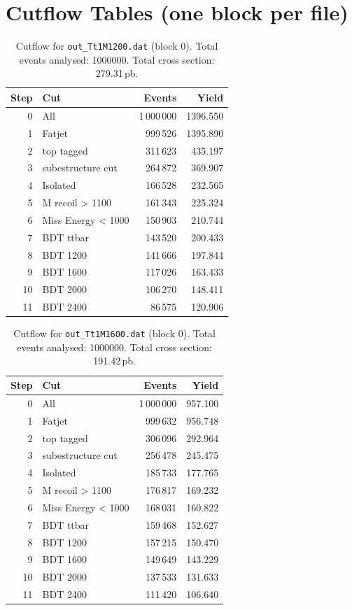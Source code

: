 \documentclass{article}
\begin{document}
\section*{Cutflow Tables (one block per file)}
\begin{table}[H]
\centering
\begin{tabular}{r l r r}
\toprule
Step & Cut & Events & Yield \\
\midrule
0 & All & 1\,000\,000 & 1396.550 \\
1 & Fatjet & 999\,526 & 1395.890 \\
2 & top tagged & 311\,623 & 435.197 \\
3 & subestructure cut & 264\,872 & 369.907 \\
4 & Isolated & 166\,528 & 232.565 \\
5 & M recoil > 1100 & 161\,343 & 225.324 \\
6 & Miss Energy < 1000 & 150\,903 & 210.744 \\
7 & BDT ttbar & 143\,520 & 200.433 \\
8 & BDT 1200 & 141\,666 & 197.844 \\
9 & BDT 1600 & 117\,026 & 163.433 \\
10 & BDT 2000 & 106\,270 & 148.411 \\
11 & BDT 2400 & 86\,575 & 120.906 \\
\bottomrule
\end{tabular}
\caption{Cutflow for \texttt{out\_Tt1M1200.dat} (block 0). Total events analysed: 1000000. Total cross section: 279.31\,pb.}
\label{tab:cutflow-out-Tt1M1200-dat}
\end{table}

\begin{table}[H]
\centering
\begin{tabular}{r l r r}
\toprule
Step & Cut & Events & Yield \\
\midrule
0 & All & 1\,000\,000 & 957.100 \\
1 & Fatjet & 999\,632 & 956.748 \\
2 & top tagged & 306\,096 & 292.964 \\
3 & subestructure cut & 256\,478 & 245.475 \\
4 & Isolated & 185\,733 & 177.765 \\
5 & M recoil > 1100 & 176\,817 & 169.232 \\
6 & Miss Energy < 1000 & 168\,031 & 160.822 \\
7 & BDT ttbar & 159\,468 & 152.627 \\
8 & BDT 1200 & 157\,215 & 150.470 \\
9 & BDT 1600 & 149\,649 & 143.229 \\
10 & BDT 2000 & 137\,533 & 131.633 \\
11 & BDT 2400 & 111\,420 & 106.640 \\
\bottomrule
\end{tabular}
\caption{Cutflow for \texttt{out\_Tt1M1600.dat} (block 0). Total events analysed: 1000000. Total cross section: 191.42\,pb.}
\label{tab:cutflow-out-Tt1M1600-dat}
\end{table}
\end{document}
